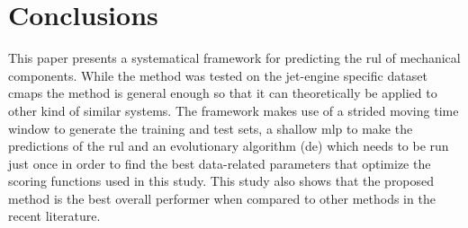 \section{Conclusions}
\label{sec:conclusions}

This paper presents a systematical framework for predicting the \gls{rul} of mechanical components. While the method was tested on the jet-engine specific dataset \gls{cmaps} the method is general enough so that it can theoretically be applied to other kind of similar systems. The framework makes use of a strided moving time window to generate the training and test sets, a shallow \gls{mlp} to make the predictions of the \gls{rul} and an evolutionary algorithm (\gls{de}) which needs to be run just once in order to find the best data-related parameters that optimize the scoring functions used in this study. This study also shows that the proposed method is the best overall performer when compared to other methods in the recent literature. 